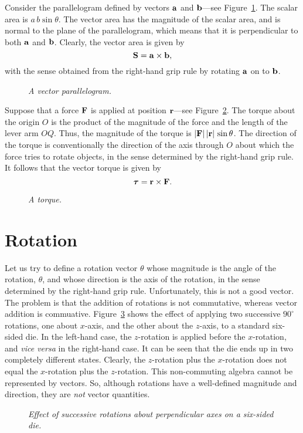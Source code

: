 Consider the parallelogram defined by vectors ${\bf a}$ and ${\bf b}$---see Figure~\ref{f7}.
The scalar area is $a\,b \sin\theta$. The vector area has the magnitude of the
scalar area, and is normal to the plane of the parallelogram, which means that
it is perpendicular to both ${\bf a}$ and ${\bf b}$. 
Clearly, the vector area
is given by
\begin{equation}
{\bf S} = {\bf a}\times {\bf b},
\end{equation}
with the sense obtained from the right-hand grip rule by rotating ${\bf a}$ on to
${\bf b}$. 
\begin{figure}[b]
\epsfysize=1.25in
\centerline{}
\caption{\em A vector parallelogram.}\label{f7}
\end{figure}


Suppose that a force ${\bf F}$ is applied at position ${\bf r}$---see Figure~\ref{f8}.
The torque about the origin $O$ is the product of the magnitude of the force and
the length of the lever arm $OQ$. Thus, the magnitude of the torque is
$|{\bf F}|\,|{\bf r}|\,\sin\theta$. The direction of the torque is conventionally the direction of
the axis through $O$ about which the force tries to rotate objects, in the sense
determined by the right-hand grip rule. It follows that the vector torque is
given by
\begin{equation}
\mbox{\boldmath$\tau$} = {\bf r}\times{\bf F}.
\end{equation}
\begin{figure}
\centerline{}
\caption{\em A torque.}\label{f8}
\end{figure}

\section{Rotation}
Let us try to define a rotation vector \mbox{\boldmath$\theta$} whose magnitude
is the angle of the rotation, $\theta$, and whose direction is the axis of the
rotation, in the sense determined by the right-hand grip rule. Unfortunately, this is not a good vector. The problem is that the addition of rotations
is not commutative, whereas vector addition is commuative. 
Figure~\ref{f9} shows the effect of applying two successive $90^\circ$ rotations,
one about $x$-axis, and the other about the $z$-axis, to a standard six-sided die. In the
left-hand case, the $z$-rotation is applied before the $x$-rotation, and {\em vice
versa} in the right-hand case. It can be seen that the die ends up in two completely
different states. Clearly, the $z$-rotation plus the
$x$-rotation does not equal
the  $x$-rotation plus the $z$-rotation. This non-commuting algebra cannot be
represented by vectors. So, although rotations have a well-defined magnitude and
direction, they are {\em not}\/ vector quantities. 
\begin{figure}
\epsfysize=3in
\centerline{}
\caption{\em Effect of successive rotations about perpendicular axes on a six-sided die.}\label{f9}
\end{figure}

